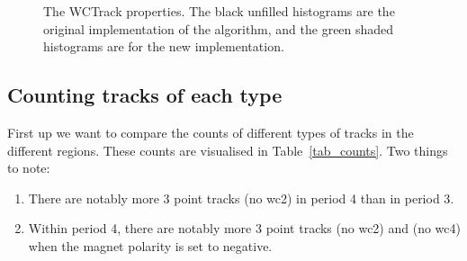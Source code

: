 \begin{figure}[h]
            
            
   \caption[short]{The WCTrack properties. The black unfilled histograms are the original implementation of the algorithm, and the green shaded histograms are for the new implementation.}
   \label{fig_props_overview}
  \end{figure}
  
  
  
    \newpage
  \subsection{Counting tracks of each type}
  
  First up we want to compare the counts of different types of tracks in the different regions. These counts are visualised in Table~\ref{tab_counts}. Two things to note:
  \begin{enumerate}
  \item There are notably more 3 point tracks (no wc2) in period 4 than in period 3.\\
  \item Within period 4, there are notably more 3 point tracks (no wc2) and (no wc4) when the magnet polarity is set to negative.
  \end{enumerate}
  

